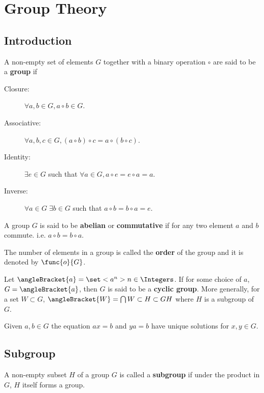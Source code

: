 \chapter{Group Theory}
\section{Introduction}
\begin{definition}
    A non-empty set of elements \(G\) together with a binary operation \(\circ\) are said to be a \textbf{group} if 
    \begin{description}
        \item[Closure:] \(\forall a,b \in G, a \circ b \in G\).
        \item[Associative:] \(\forall a,b,c \in G, (a \circ b ) \circ c = a \circ (b \circ c)\).
        \item[Identity:] \(\exists e \in G\) such that \(\forall a\in G, a \circ e = e \circ a = a\).  
        \item[Inverse:] \(\forall a \in G \; \exists b \in G\) such that \(a \circ b = b \circ a = e\).  
    \end{description}
\end{definition}

\begin{definition}
    A group \(G\) is said to be \textbf{abelian} or \textbf{commutative} if for any two element \(a\) and \(b\) commute. i.e. \(a \circ b = b \circ a\).
\end{definition}

\begin{definition}
    The number of elements in a group is called the \textbf{order} of the group and it is denoted by \(\func{o}{G}\).
\end{definition}

\begin{definition}
    Let \(\angleBracket{a} = \set<a^n>{n \in \Integers}\). If for some choice of \(a\), \(G = \angleBracket{a}\), then \(G\) is said to be a \textbf{cyclic group}. More generally, for a set \(W \subset G\), \(\angleBracket{W} = \bigcap{W \subset H \subset G} H\) where \(H\) is a subgroup of \(G\).
\end{definition}

\begin{lemma}
    Given \(a,b \in G\) the equation \(ax = b\) and \(ya = b\) have unique solutions for \(x,y \in G\).
\end{lemma}

\section{Subgroup}
\begin{definition}
    A non-empty subset \(H\) of a group \(G\) is called a \textbf{subgroup} if under the product in \(G\), \(H\) itself forms a group.
\end{definition}

